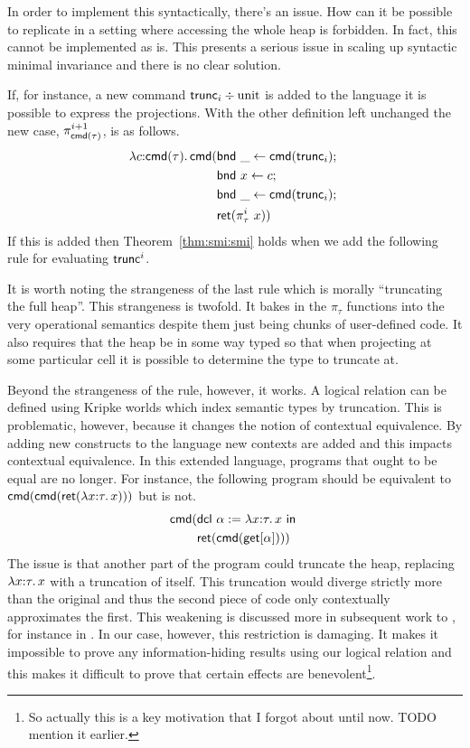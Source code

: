 In order to implement this syntactically, there's an issue. How can it
be possible to replicate in a setting where accessing the whole heap
is forbidden. In fact, this cannot be implemented as is. This presents
a serious issue in scaling up syntactic minimal invariance and there
is no clear solution.

If, for instance, a new command $\mathsf{trunc}_i \div \mathrm{unit}$ is
added to the language it is possible to express the projections. With
the other definition left unchanged the new case,
$\pi_{\mathsf{cmd}(\tau)}^{i + 1}$, is as follows.
\begin{align*}
  \lambda c {:} \mathsf{cmd}(\tau).\, \mathsf{cmd}(& \mathsf{bnd}\ \_ \gets \mathsf{cmd}(\mathsf{trunc}_i);\ \\
        & \mathsf{bnd}\ x \gets c;\ \\
        & \mathsf{bnd}\ \_ \gets \mathsf{cmd}(\mathsf{trunc}_i);\ \\
        & \mathsf{ret}(\pi_\tau^i\ x))
\end{align*}
If this is added then Theorem~\ref{thm:smi:smi} holds when we add the
following rule for evaluating $\mathsf{trunc}^i$.
It is worth noting the strangeness of the last rule which is morally
``truncating the full heap''. This strangeness is twofold. It bakes in
the $\pi_\tau$ functions into the very operational semantics despite
them just being chunks of user-defined code. It also requires that the
heap be in some way typed so that when projecting at some particular
cell it is possible to determine the type to truncate at.

Beyond the strangeness of the rule, however, it works. A logical
relation can be defined using Kripke worlds which index semantic types
by truncation. This is problematic, however, because it changes the
notion of contextual equivalence. By adding new constructs to the
language new contexts are added and this impacts contextual
equivalence. In this extended language, programs that ought to be
equal are no longer. For instance, the following program should be
equivalent to $\mathsf{cmd}(\mathsf{cmd}(\mathsf{ret}(\lambda x {:} \tau.\, x)))$ but is not.
\begin{align*}
  \mathsf{cmd}(& \mathsf{dcl}\ \alpha := \lambda x {:} \tau.\, x\ \mathsf{in}\ \\
       & \mathsf{ret}(\mathsf{cmd}(\mathsf{get}[\alpha])))
\end{align*}
The issue is that another part of the program could truncate the heap,
replacing $\lambda x {:} \tau.\, x$ with a truncation of itself. This
truncation would diverge strictly more than the original and thus the
second piece of code only contextually approximates the first. This
weakening is discussed more in subsequent work to
\citet{Birkedal:domains:10}, for instance in
\citet{TODO-FOLLOW-UP}. In our case, however, this restriction is
damaging. It makes it impossible to prove any information-hiding
results using our logical relation and this makes it difficult to
prove that certain effects are benevolent\footnote{So actually this is
  a key motivation that I forgot about until now. TODO mention it
  earlier.}.

